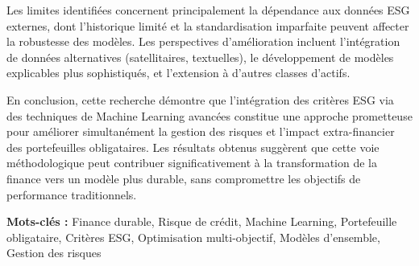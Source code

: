 Les limites identifiées concernent principalement la dépendance aux données ESG externes, dont l'historique limité et la standardisation imparfaite peuvent affecter la robustesse des modèles. Les perspectives d'amélioration incluent l'intégration de données alternatives (satellitaires, textuelles), le développement de modèles explicables plus sophistiqués, et l'extension à d'autres classes d'actifs.

En conclusion, cette recherche démontre que l'intégration des critères ESG via des techniques de Machine Learning avancées constitue une approche prometteuse pour améliorer simultanément la gestion des risques et l'impact extra-financier des portefeuilles obligataires. Les résultats obtenus suggèrent que cette voie méthodologique peut contribuer significativement à la transformation de la finance vers un modèle plus durable, sans compromettre les objectifs de performance traditionnels.

\textbf{Mots-clés :} Finance durable, Risque de crédit, Machine Learning, Portefeuille obligataire, Critères ESG, Optimisation multi-objectif, Modèles d'ensemble, Gestion des risques